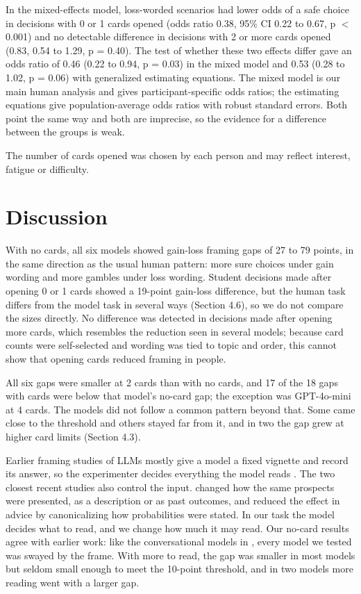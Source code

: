 \documentclass[11pt]{article}
\begin{document}
In the mixed-effects model, loss-worded scenarios had lower odds of a safe choice in decisions with 0 or 1 cards opened (odds ratio 0.38, 95\% CI 0.22 to 0.67, p $<$ 0.001) and no detectable difference in decisions with 2 or more cards opened (0.83, 0.54 to 1.29, p = 0.40). The test of whether these two effects differ gave an odds ratio of 0.46 (0.22 to 0.94, p = 0.03) in the mixed model and 0.53 (0.28 to 1.02, p = 0.06) with generalized estimating equations. The mixed model is our main human analysis and gives participant-specific odds ratios; the estimating equations give population-average odds ratios with robust standard errors. Both point the same way and both are imprecise, so the evidence for a difference between the groups is weak.

The number of cards opened was chosen by each person and may reflect interest, fatigue or difficulty.

\section{Discussion}

With no cards, all six models showed gain-loss framing gaps of 27 to 79 points, in the same direction as the usual human pattern: more sure choices under gain wording and more gambles under loss wording. Student decisions made after opening 0 or 1 cards showed a 19-point gain-loss difference, but the human task differs from the model task in several ways (Section 4.6), so we do not compare the sizes directly. No difference was detected in decisions made after opening more cards, which resembles the reduction seen in several models; because card counts were self-selected and wording was tied to topic and order, this cannot show that opening cards reduced framing in people.

All six gaps were smaller at 2 cards than with no cards, and 17 of the 18 gaps with cards were below that model's no-card gap; the exception was GPT-4o-mini at 4 cards. The models did not follow a common pattern beyond that. Some came close to the threshold and others stayed far from it, and in two the gap grew at higher card limits (Section 4.3).

Earlier framing studies of LLMs mostly give a model a fixed vignette and record its answer, so the experimenter decides everything the model reads \citep{binz2023using,echterhoff2024cognitive}. The two closest recent studies also control the input. \citet{ge2026mind} changed how the same prospects were presented, as a description or as past outcomes, and \citet{zhang2026same} reduced the effect in advice by canonicalizing how probabilities were stated. In our task the model decides what to read, and we change how much it may read. Our no-card results agree with earlier work: like the conversational models in \citet{ge2026mind}, every model we tested was swayed by the frame. With more to read, the gap was smaller in most models but seldom small enough to meet the 10-point threshold, and in two models more reading went with a larger gap.
\end{document}
